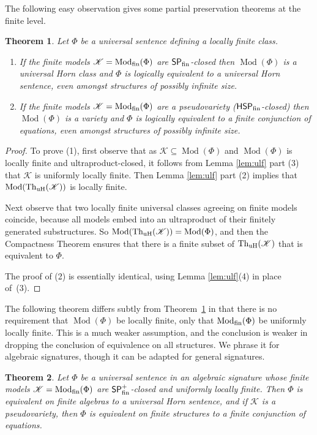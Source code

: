\documentclass[reqno]{amsart}
\theoremstyle{plain}
\newtheorem{thm}{Theorem}[section]
\theoremstyle{definition}
\newcommand{\up}[1]{\textup{#1}}
\newcommand{\Mod}{\operatorname{Mod}}
\newcommand{\Th}{\operatorname{Th}}
\begin{document}
The following easy observation gives some partial preservation theorems at the finite level.
\begin{thm}\label{thm:Aequation}
Let $\Phi$ be a {universal} sentence defining a locally finite class.
\begin{enumerate}
\item If the finite models $\mathscr{K}=\Mod_{\rm fin}(\Phi)$ are
$\mathsf{SP}_{\rm fin}$-closed then $\Mod(\Phi)$ is a universal Horn class and $\Phi$ is logically equivalent to a universal Horn sentence, even amongst structures of possibly infinite size.
\item If the finite models $\mathscr{K}=\Mod_{\rm fin}(\Phi)$ are a pseudovariety \up($\mathsf{HSP}_{\rm fin}$-closed\up) then $\Mod(\Phi)$ is a variety and $\Phi$ is logically equivalent to a finite conjunction of equations, even amongst structures of possibly infinite size.
\end{enumerate}
\end{thm}
\begin{proof}
To prove (1), first observe that as $\mathscr{K}\subseteq \Mod(\Phi)$ and $\Mod(\Phi)$ is locally finite and ultra\-product-closed, it follows from Lemma \ref{lem:ulf} part (3) that $\mathscr{K}$ is uniformly locally finite.   
Then Lemma \ref{lem:ulf} part (2) implies that $\Mod(\Th_{\rm uH}(\mathscr{K}))$ is locally finite.  

Next observe that two locally finite universal classes agreeing on finite models coincide, because all models embed into an ultraproduct of their finitely generated substructures.  So $\Mod(\Th_{\rm uH}(\mathscr{K}))=\Mod(\Phi)$, and then the Compactness Theorem  ensures that there is a finite subset of $\Th_{\rm uH}(\mathscr{K})$ that is equivalent to $\Phi$.

The proof of (2) is essentially identical, using Lemma \ref{lem:ulf}(4) in place of~(3).
\end{proof}
The following theorem differs subtly from Theorem~\ref{thm:Aequation} in that there is no requirement that $\Mod(\Phi)$ be locally finite, only that $\Mod_{\rm fin}(\Phi)$ be uniformly locally finite.  
This is a much weaker assumption, and the conclusion is weaker in dropping the conclusion of equivalence on all structures.
We phrase it for algebraic signatures, though it can be adapted for general signatures.
\begin{thm}\label{thm:Aequation2}
Let $\Phi$ be a universal sentence in an algebraic signature whose finite models $\mathscr{K}=\Mod_{\rm fin}(\Phi)$ are $\mathsf{SP}_{\rm fin}^+$-closed and uniformly locally finite.
Then $\Phi$ is equivalent on finite algebras to a universal Horn sentence, and if $\mathscr{K}$ is a pseudovariety, then $\Phi$ is equivalent on finite structures to a finite conjunction of equations.
\end{thm}
\end{document}
